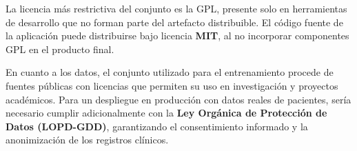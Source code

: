 La licencia más restrictiva del conjunto es la GPL, presente solo en herramientas de desarrollo que no forman parte del artefacto distribuible. El código fuente de la aplicación puede distribuirse bajo licencia \textbf{MIT}, al no incorporar componentes GPL en el producto final.

En cuanto a los datos, el conjunto utilizado para el entrenamiento procede de fuentes públicas con licencias que permiten su uso en investigación y proyectos académicos. Para un despliegue en producción con datos reales de pacientes, sería necesario cumplir adicionalmente con la \textbf{Ley Orgánica de Protección de Datos (LOPD-GDD)}, garantizando el consentimiento informado y la anonimización de los registros clínicos.